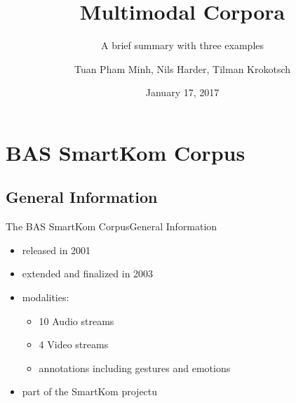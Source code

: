 \documentclass{beamer}
\title{Multimodal Corpora}
\subtitle{A brief summary with three examples}
\author{Tuan Pham Minh, Nils Harder, Tilman Krokotsch}
\date{January 17, 2017}
\begin{document}
	\beamertemplatenavigationsymbolsempty
	
	\setcounter{tocdepth}{1}

	\maketitle
	
	\begin{frame}
		\tableofcontents
	\end{frame}
	
	\section{BAS SmartKom Corpus} 	
	\subsection{General Information}
			\begin{frame}{The BAS SmartKom Corpus}{General Information}			
				\begin{itemize}
					\item released in 2001
					\cite{basSKP}
					\item extended and finalized in 2003
					\item modalities:
					\begin{itemize}
						\item 10 Audio streams
						\item 4 Video streams
						\item annotations including gestures and emotions
					\end{itemize}
					\item part of the SmartKom projectu
				\end{itemize}											
			\end{frame}		
\end{document}
